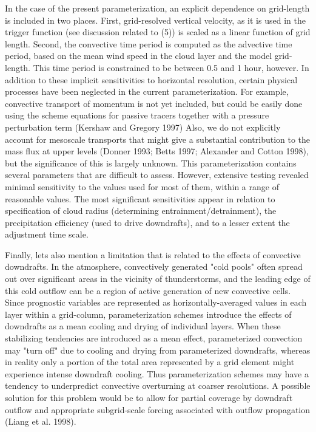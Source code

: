 In the case of the present parameterization, an explicit dependence on
grid-length is included in two places.  First, grid-resolved vertical velocity,
as it is used in the trigger function (see discussion related to (5))
is scaled as a linear function of grid length.  Second, the convective time
period is computed as the advective time period, based on the mean wind speed in
the cloud layer and the model grid-length.  This time period is constrained to
be between 0.5 and 1 hour, however.
In addition to these implicit sensitivities to horizontal resolution, certain
physical processes have been neglected in the current parameterization.
For example, convective transport of momentum is not yet included, but could be
easily done using the scheme equations for passive tracers together with a pressure
perturbation term (Kershaw and Gregory 1997) 
Also, we do not explicitly account for mesoscale transports
that might give a substantial contribution to the mass flux at upper levels
(Donner 1993; Betts 1997; Alexander and Cotton 1998),
but the significance of this is largely unknown.
This parameterization contains several parameters that are difficult to assess.
 However, extensive testing
revealed minimal sensitivity to the values used for most of them, within a range
of reasonable values.  The most significant sensitivities appear in relation to
specification of cloud radius (determining entrainment/detrainment), the
precipitation efficiency (used to drive downdrafts), and to a lesser extent the
adjustment time scale.

Finally, lets also mention a limitation that is related to the effects of
convective downdrafts.   
In the atmosphere, convectively generated "cold pools" often spread out
over significant areas in the vicinity of thunderstorms, and the leading edge of
this cold outflow can be a region of active generation of new convective cells.
Since  prognostic variables are represented as horizontally-averaged values in
each layer within a grid-column, parameterization schemes introduce 
the effects of downdrafts as a mean cooling and drying of individual layers.
When these stabilizing tendencies are introduced as a mean effect, parameterized
convection may "turn off" due to  cooling and drying from parameterized downdrafts,
whereas in reality only a
portion of the total area represented by a grid element might experience intense
downdraft cooling. Thus 
parameterization schemes may have a tendency to
underpredict convective overturning at coarser resolutions.  A possible solution
for this problem would be to allow for partial coverage by downdraft outflow and
appropriate subgrid-scale forcing associated with outflow propagation (Liang et
al. 1998).

